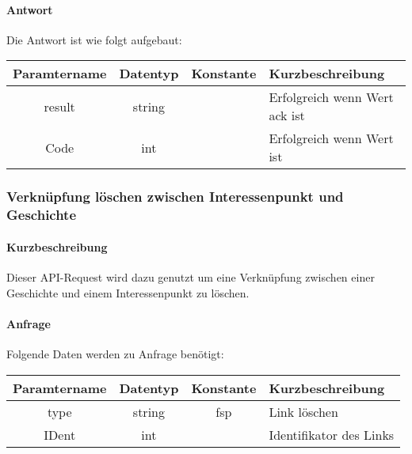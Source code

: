 \paragraph{Antwort}Die Antwort ist wie folgt aufgebaut:
\begin{table}[H]
	\begin{tabular}{|c|c|c|p{6.5cm}|}
		\hline
		\textbf{Paramtername} & \textbf{Datentyp} & \textbf{Konstante} & \textbf{Kurzbeschreibung}                                                                                               \\ \hline
		result              & string           &                 & Erfolgreich wenn Wert {\glqq ack\grqq} ist \\ \hline
		Code                & int              &                 & Erfolgreich wenn Wert {\glqq 0\grqq} ist \\ \hline
	\end{tabular}
\end{table}
\subsubsection{Verknüpfung löschen zwischen Interessenpunkt und Geschichte}
\paragraph{Kurzbeschreibung}Dieser API-Request wird dazu genutzt um eine Verknüpfung zwischen einer Geschichte und einem Interessenpunkt zu löschen.
\paragraph{Anfrage}Folgende Daten werden zu Anfrage benötigt:
\begin{table}[H]
	\begin{tabular}{|c|c|c|p{6.5cm}|}
		\hline
		\textbf{Paramtername} & \textbf{Datentyp} & \textbf{Konstante} & \textbf{Kurzbeschreibung}                                                                                               \\ \hline
		type                & string            & fsp                & Link löschen \\ \hline
		IDent               & int               &                    & Identifikator des Links \\ \hline
	\end{tabular}
\end{table}
